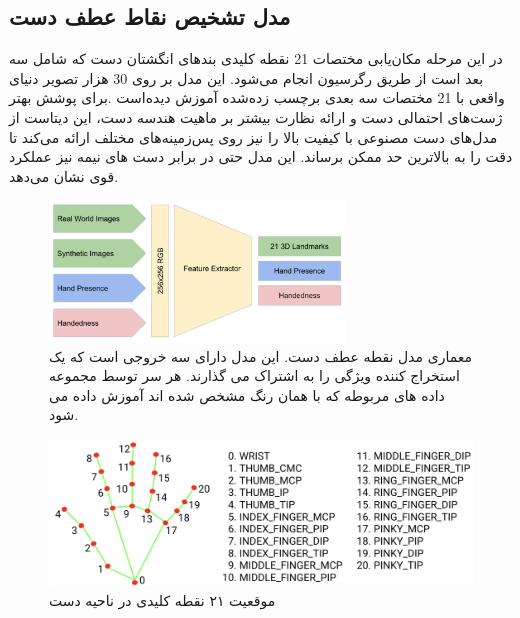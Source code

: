 \subsection{مدل تشخیص نقاط عطف دست}
در این مرحله مکان‌یابی مختصات 21 نقطه کلیدی بند‌های انگشتان دست که شامل سه بعد است از طریق رگرسیون 
انجام می‌شود. این مدل بر روی 30 هزار تصویر دنیای واقعی با 21 مختصات سه بعدی برچسب زده‌شده 
آموزش دیده‌است .برای پوشش بهتر ژست‌های احتمالی دست و ارائه نظارت بیشتر بر ماهیت هندسه دست، این دیتاست از مدل‌های دست مصنوعی
با کیفیت بالا را نیز روی پس‌زمینه‌های مختلف ارائه می‌کند تا دقت را به بالاترین حد ممکن برساند. این مدل حتی در برابر دست های نیمه نیز عملکرد قوی نشان می‌دهد. \cite{zhang2020mediapipe}

\begin{figure}[h]
    \centering
    \includegraphics[width=0.7\textwidth]{landmark.png}
    \caption{معماری مدل نقطه عطف دست. این مدل دارای سه خروجی است که یک استخراج کننده ویژگی را به اشتراک می گذارند. هر سر توسط مجموعه داده های مربوطه که با همان رنگ مشخص شده اند آموزش داده می شود.}
\end{figure}

\begin{figure}[h]
    \centering
    \includegraphics[width=1\textwidth]{hand-landmarks.png}
    \caption{موقعیت ۲۱ نقطه کلیدی در ناحیه دست}
\end{figure}


